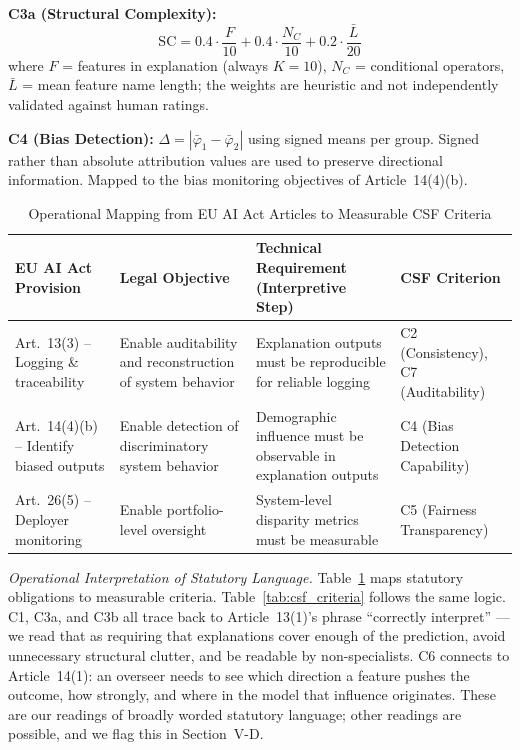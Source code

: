 \documentclass[conference]{IEEEtran}
\begin{document}
\noindent\textbf{C3a (Structural Complexity):}
\begin{equation}
    \text{SC} = 0.4 \cdot \frac{F}{10} + 0.4 \cdot \frac{N_C}{10} + 0.2 \cdot \frac{\bar{L}}{20}
\end{equation}
where $F$ = features in explanation (always $K = 10$), $N_C$ = conditional operators, $\bar{L}$ = mean feature name length; the weights are heuristic and not independently validated against human ratings.
\smallskip


\noindent\textbf{C4 (Bias Detection):} $\Delta = |\bar{\varphi}_1 - \bar{\varphi}_2|$ using signed means per group. Signed rather than absolute attribution values are used to preserve
directional information. Mapped to the bias monitoring objectives of
Article~14(4)(b).
\smallskip

\begin{table}[h]
\caption{Operational Mapping from EU AI Act Articles to Measurable CSF Criteria}
\label{tab:op_mapping}
\centering
\small
\renewcommand{\arraystretch}{1.4}
\begin{tabular}{p{1.6cm}p{1.8cm}p{2.4cm}p{1.4cm}}
\hline
\textbf{EU AI Act Provision} & \textbf{Legal Objective} & \textbf{Technical Requirement (Interpretive Step)} & \textbf{CSF Criterion} \\
\hline
\hline
Art.~13(3) -- Logging \& traceability & Enable auditability and reconstruction of system behavior & Explanation outputs must be reproducible for reliable logging & C2 (Consistency), C7 (Auditability) \\[6pt]
Art.~14(4)(b) -- Identify biased outputs & Enable detection of discriminatory system behavior & Demographic influence must be observable in explanation outputs & C4 (Bias Detection Capability) \\[6pt]
Art.~26(5) -- Deployer monitoring & Enable portfolio-level oversight & System-level disparity metrics must be measurable & C5 (Fairness Transparency) \\
\hline
\end{tabular}
\end{table}


\noindent\textit{Operational Interpretation of Statutory Language.} Table~\ref{tab:op_mapping} maps statutory obligations to measurable criteria. Table~\ref{tab:csf_criteria} follows the same logic. C1, C3a, and C3b all trace back to Article~13(1)'s phrase ``correctly interpret'' --- we read that as requiring that explanations cover enough of the prediction, avoid unnecessary structural clutter, and be readable by non-specialists. C6 connects to Article~14(1): an overseer needs to see which direction a feature pushes the outcome, how strongly, and where in the model that influence originates. These are our readings of broadly worded statutory language; other readings are possible, and we flag this in Section~V-D.
\smallskip
\end{document}
